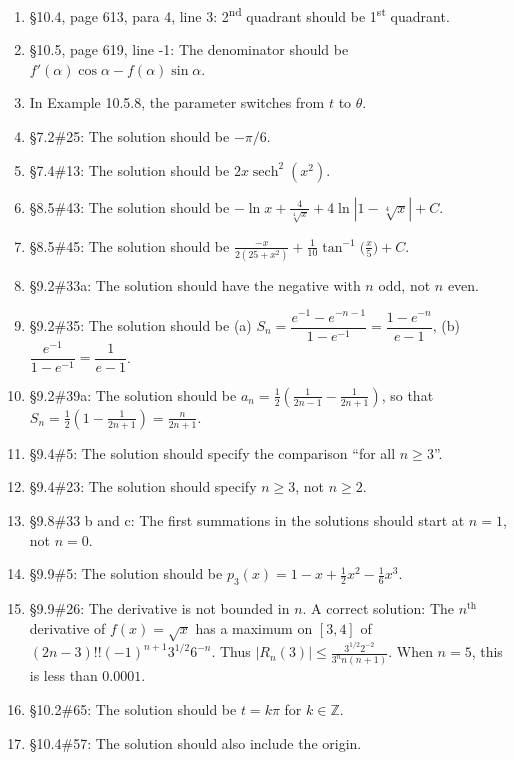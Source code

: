 \documentclass{amsart}
\newcommand{\ds}{\displaystyle}
\newcommand{\abs}[1]{\left\lvert#1\right\rvert}
\DeclareMathOperator{\sech}{sech}
\begin{document}
\begin{enumerate}
\item \S10.4, page 613, para 4, line 3: 2\textsuperscript{nd} quadrant should be 1\textsuperscript{st} quadrant.
\item \S10.5, page 619, line -1: The denominator should be $f'(\alpha)\cos\alpha-f(\alpha)\sin\alpha$.
\item In Example 10.5.8, the parameter switches from $t$ to $\theta$.
\item \S7.2\#25: The solution should be $-\pi/6$.
\item \S7.4\#13: The solution should be $2x\sech^2(x^2)$.
\item \S8.5\#43: The solution should be $\ds-\ln x+\frac4{\sqrt[4]{x}}+4\ln\abs{1-\sqrt[4]{x}}+C$.
\item \S8.5\#45: The solution should be $\ds\frac{-x}{2(25+x^2)}+\frac1{10}\tan^{-1}\bigl(\frac x5\bigr)+C$.
\item \S9.2\#33a: The solution should have the negative with $n$ odd, not $n$ even.
\item \S9.2\#35: The solution should be (a) $S_n=\dfrac{e^{-1}-e^{-n-1}}{1-e^{-1}}=\dfrac{1-e^{-n}}{e-1}$, (b) $\dfrac{e^{-1}}{1-e^{-1}}=\dfrac1{e-1}$.
\item \S9.2\#39a: The solution should be $a_n = \frac12\left(\frac{1}{2n-1}-\frac{1}{2n+1}\right)$, so that $S_n=\frac12\left(1-\frac1{2n+1}\right) = \frac{n}{2n+1}$.
\item \S9.4\#5: The solution should specify the comparison ``for all $n\ge 3$''.
\item \S9.4\#23: The solution should specify $n\ge3$, not $n\ge2$.
\item \S9.8\#33 b and c: The first summations in the solutions should start at $n=1$, not $n=0$.
\item \S9.9\#5: The solution should be $p_3(x)=1-x+\frac12 x^2-\frac16 x^3$.
\item \S9.9\#26: The derivative is not bounded in $n$.  A correct solution: The $n^\text{th}$ derivative of $f(x)=\sqrt x$ has a maximum on $[3,4]$ of $(2n-3)!!(-1)^{n+1}3^{1/2}6^{-n}$.  Thus $\abs{R_n(3)}\leq \frac{3^{1/2}2^{-2}}{3^n n(n+1)}$. When $n=5$, this is less than $0.0001$.
\item \S10.2\#65: The solution should be $t=k\pi$ for $k\in\mathbb{Z}$.
\item \S10.4\#57: The solution should also include the origin.
\label{2018-07-13IIplus}
\end{enumerate}\bigskip
\end{document}
